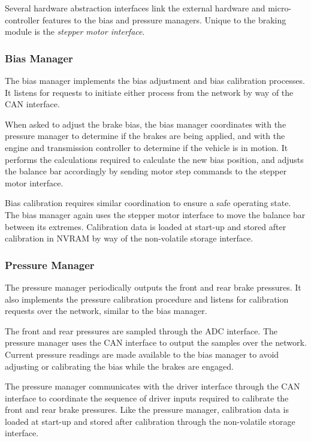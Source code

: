 Several hardware abstraction interfaces link the external hardware and micro-controller features to the bias and pressure managers. Unique to the braking module is the \emph{stepper motor interface}. 

\subsubsection{Bias Manager}

The bias manager implements the bias adjustment and bias calibration processes. It listens for requests to initiate either process from the network by way of the CAN interface.

When asked to adjust the brake bias, the bias manager coordinates with the pressure manager to determine if the brakes are being applied, and with the engine and transmission controller to determine if the vehicle is in motion. It performs the calculations required to calculate the new bias position, and adjusts the balance bar accordingly by sending motor step commands to the stepper motor interface.

Bias calibration requires similar coordination to ensure a safe operating state. The bias manager again uses the stepper motor interface to move the balance bar between its extremes. Calibration data is loaded at start-up and stored after calibration in NVRAM by way of the non-volatile storage interface.

\subsubsection{Pressure Manager}

The pressure manager periodically outputs the front and rear brake pressures. It also implements the pressure calibration procedure and listens for calibration requests over the network, similar to the bias manager.

The front and rear pressures are sampled through the ADC interface. The pressure manager uses the CAN interface to output the samples over the network. Current pressure readings are made available to the bias manager to avoid adjusting or calibrating the bias while the brakes are engaged.

The pressure manager communicates with the driver interface through the CAN interface to coordinate the sequence of driver inputs required to calibrate the front and rear brake pressures. Like the pressure manager, calibration data is loaded at start-up and stored after calibration through the non-volatile storage interface.

